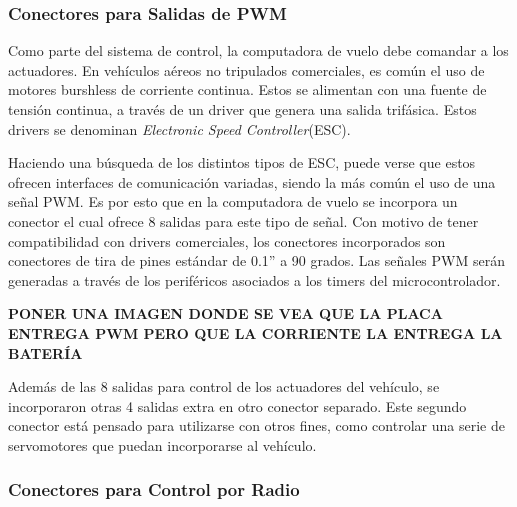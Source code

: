 \subsubsection{Conectores para Salidas de PWM}

Como parte del sistema de control, la computadora de vuelo debe comandar a los actuadores. En vehículos aéreos no tripulados comerciales, es común el uso de motores burshless de corriente continua. Estos se alimentan con una fuente de tensión continua, a través de un driver que genera una salida trifásica. Estos drivers se denominan \textit{Electronic Speed Controller}(ESC). 

Haciendo una búsqueda de los distintos tipos de ESC, puede verse que estos ofrecen interfaces de comunicación variadas, siendo la más común el uso de una señal PWM. Es por esto que en la computadora de vuelo se incorpora un conector el cual ofrece 8 salidas para este tipo de señal. Con motivo de tener compatibilidad con drivers comerciales, los conectores incorporados son conectores de tira de pines estándar de 0.1” a 90 grados. Las señales PWM serán generadas a través de los periféricos asociados a los timers del microcontrolador.

\textbf{{\color{red} PONER UNA IMAGEN DONDE SE VEA QUE LA PLACA ENTREGA PWM PERO QUE LA CORRIENTE LA ENTREGA LA BATERÍA}}

Además de las 8 salidas para control de los actuadores del vehículo, se incorporaron otras 4 salidas extra en otro conector separado. Este segundo conector está pensado para utilizarse con otros fines, como controlar una serie de servomotores que puedan incorporarse al vehículo.


\subsubsection{Conectores para Control por Radio}


